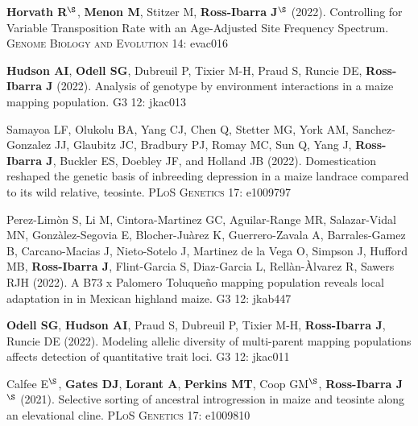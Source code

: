 \documentclass[letterpaper,10pt]{article}
\begin{document}
\begin{etaremune}
\item \textbf{Horvath R}$^\S$, \textbf{Menon M}, Stitzer M, \textbf{Ross-Ibarra J}$^\S$ (2022). Controlling for Variable Transposition Rate with an Age-Adjusted Site Frequency Spectrum. \textsc{Genome Biology and Evolution}  14: evac016 %

\item \textbf{Hudson AI}, \textbf{Odell SG}, Dubreuil P, Tixier M-H, Praud S, Runcie DE, \textbf{Ross-Ibarra J} (2022).  Analysis of genotype by environment interactions in a maize mapping population. \textsc{G3} 12: jkac013 %

\item  Samayoa LF, Olukolu  BA, Yang CJ, Chen Q, Stetter MG, York AM, Sanchez-Gonzalez JJ,  Glaubitz JC, Bradbury PJ,  Romay MC, Sun Q, Yang J, \textbf{Ross-Ibarra J}, Buckler ES, Doebley JF, and Holland JB (2022).   Domestication reshaped the genetic basis of inbreeding depression in a maize landrace compared to its wild relative, teosinte. \textsc{PLoS Genetics} 17: e1009797 %

\item Perez-Lim\`{o}n S, Li M, Cintora-Martinez GC, Aguilar-Range MR, Salazar-Vidal MN, Gonz\`{a}lez-Segovia E, Blocher-Ju\`{a}rez K, Guerrero-Zavala A, Barrales-Gamez B, Carcano-Macias J,  Nieto-Sotelo J, Martinez de la Vega O, Simpson J, Hufford MB, \textbf{Ross-Ibarra J}, Flint-Garcia S, Diaz-Garcia L, Rell\`{a}n-\`{A}lvarez R, Sawers RJH (2022). A B73 x Palomero Toluque\~{n}o mapping population reveals local adaptation in in Mexican highland maize. \textsc{G3} 12: jkab447 %

\item \textbf{Odell SG}, \textbf{Hudson AI}, Praud S, Dubreuil P, Tixier M-H, \textbf{Ross-Ibarra J}, Runcie DE (2022). Modeling allelic diversity of multi-parent mapping populations affects detection of quantitative trait loci. \textsc{G3} 12: jkac011 %
\vspace{0.5cm}

\item Calfee E$^\S$, \textbf{Gates DJ}, \textbf{Lorant A}, \textbf{Perkins MT}, Coop GM$^\S$, \textbf{Ross-Ibarra J}$^\S$ (2021). Selective sorting of ancestral introgression in maize and teosinte along an elevational cline. \textsc{PLoS Genetics} 17: e1009810


\end{etaremune}
\end{document}
